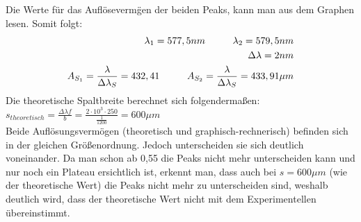 Die Werte f\"ur das Aufl\"oseverm\"gen der beiden Peaks, kann man aus dem Graphen lesen. Somit folgt:\\
\begin{align}
\lambda_1=577,5nm \hspace*{1cm} \lambda_2=579,5nm\\
\Delta\lambda=2nm\\
A_{S_1}=\frac{\lambda}{\Delta\lambda_S}=432,41 \hspace*{1cm} A_{S_2}=\frac{\lambda}{\Delta\lambda_S}=433,91\mu m
\end{align}
Die theoretische Spaltbreite berechnet sich folgenderma\ss{}en:\\
$s_{theoretisch} = \frac{\Delta\lambda f}{b}=\frac{2 \cdot 10^3 \cdot 250}{\frac{1}{1200}}= 600\mu m$\\
Beide Aufl\"osungsverm\"ogen (theoretisch und graphisch-rechnerisch) befinden sich in der gleichen Gr\"o\ss{}enordnung. Jedoch unterscheiden sie sich deutlich 
voneinander. Da man schon ab 0,55 die Peaks nicht mehr unterscheiden kann und nur noch ein Plateau ersichtlich ist, erkennt man, dass auch bei $s=600\mu m$ (wie der 
theoretische Wert) die Peaks nicht mehr zu unterscheiden sind, weshalb deutlich wird, dass der theoretische Wert nicht mit dem Experimentellen \"ubereinstimmt.
